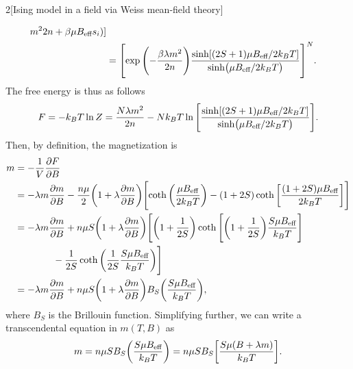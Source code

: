 \documentclass[12pt]{article}
\begin{document}
\begin{problem}{2}[Ising model in a field via Weiss mean-field theory]
\begin{solution}
\begin{align}
{    m^2}{2n}+\beta\mu B_{\text{eff}}s_i)]\notag\\
    &=\qty[\exp\qty(-\frac{\beta \lambda m^2}{2n})\frac{\sinh[(2S+1)\mu
    B_{\text{eff}}/2k_BT]}{\sinh(\mu B_{\text{eff}}/2k_BT)}]^N.
\end{align}
The free energy is thus as follows
\begin{equation}\label{p2a:F}
    F=-k_BT\ln Z
    =\frac{N\lambda m^2}{2n}-Nk_BT\ln\qty[\frac{\sinh[(2S+1)\mu
    B_{\text{eff}}/2k_BT]}{\sinh(\mu B_{\text{eff}}/2k_BT)}].
\end{equation}
Then, by definition, the magnetization is
\begin{align}
    m
    &=-\frac1V\frac{\partial F}{\partial B}\notag\\
    &=-\lambda m\frac{\partial m}{\partial B}
    -\frac{n\mu}{2}\qty(1+\lambda\frac{\partial m}{\partial B})
    \qty[\coth\qty(\frac{\mu B_{\text{eff}}}{2k_BT})-(1+2S)\coth\qty[\frac{(1+2S)\mu
B_{\text{eff}}}{2k_BT}]]\notag\\
    &=-\lambda m\frac{\partial m}{\partial B}
    +n\mu S\qty(1+\lambda\frac{\partial m}{\partial B})
    \Bigg[\qty(1+\frac{1}{2S})\coth\qty[\qty(1+\frac1{2S})\frac{S\mu
    B_{\text{eff}}}{k_BT}]\notag\\
    &\qquad\qquad-\frac1{2S}\coth\qty(\frac1{2S}\frac{S\mu
B_{\text{eff}}}{k_BT})\Bigg]\notag\\
    &=-\lambda m\frac{\partial m}{\partial B}
    +n\mu S\qty(1+\lambda\frac{\partial m}{\partial B})
    B_S\qty(\frac{S\mu B_{\text{eff}}}{k_BT}),
\end{align}
where $B_S$ is the Brillouin function. Simplifying further, we can write a
transcendental equation in $m(T,B)$ as
\begin{equation}\label{p2b:m}
    m=n\mu SB_S\qty(\frac{S\mu B_{\text{eff}}}{k_BT})
    =n\mu SB_S\qty[\frac{S\mu(B+\lambda m)}{k_BT}].
\end{equation}
\end{solution}


\end{problem}
\end{document}
